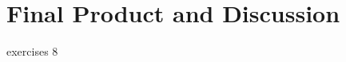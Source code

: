 \documentclass[../Head/Main.tex]{subfiles}
\begin{document}
\section{Final Product and Discussion}
exercises 8
\end{document}

